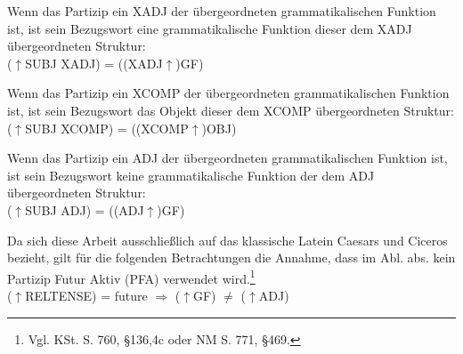 \documentclass[12pt,a4paper]{article}
\begin{document}


Wenn das Partizip ein XADJ der übergeordneten grammatikalischen Funktion ist, ist sein Bezugswort eine grammatikalische Funktion dieser dem XADJ übergeordneten Struktur: \\
($\uparrow$SUBJ XADJ) = ((XADJ$\uparrow$)GF)

Wenn das Partizip ein XCOMP der übergeordneten grammatikalischen Funktion ist, ist sein Bezugswort das Objekt dieser dem XCOMP übergeordneten Struktur: \\
($\uparrow$SUBJ XCOMP) = ((XCOMP$\uparrow$)OBJ) 

Wenn das Partizip ein ADJ der übergeordneten grammatikalischen Funktion ist, ist sein Bezugswort keine grammatikalische Funktion der dem ADJ übergeordneten Struktur: \\
($\uparrow$SUBJ ADJ) = ((ADJ$\uparrow$)GF)




Da sich diese Arbeit ausschließlich auf das klassische Latein Caesars und Ciceros bezieht, gilt für die folgenden Betrachtungen die Annahme, dass im Abl. abs. kein Partizip Futur Aktiv (PFA) verwendet wird.\footnote{Vgl. KSt. S. 760, §136,4c oder NM S. 771, §469.}\\
($\uparrow$RELTENSE) = future $\Rightarrow$ ($\uparrow$GF) $\neq$ ($\uparrow$ADJ)
\end{document}
